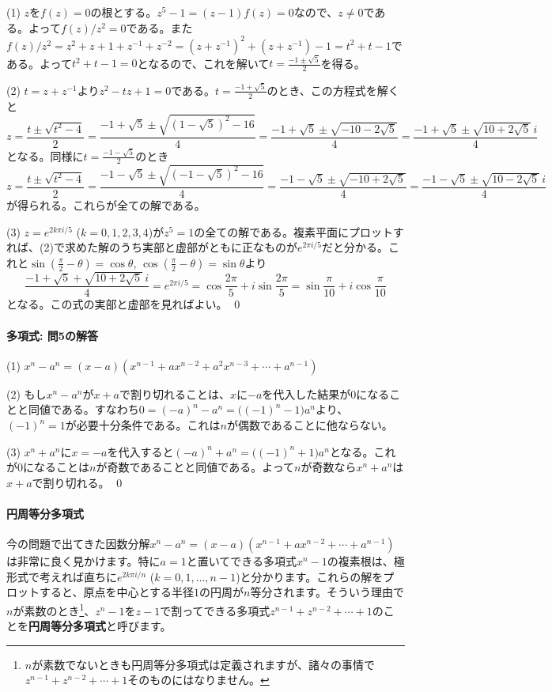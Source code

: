 \noindent (1) $z$を$f(z)=0$の根とする。$z^5-1=(z-1)f(z)=0$なので、$z\neq 0$である。よって$f(z)/z^2=0$である。また$f(z)/z^2=z^2+z+1+z^{-1}+z^{-2} = (z+z^{-1})^2 + (z+z^{-1}) - 1 = t^2+t-1$である。よって$t^2+t-1=0$となるので、これを解いて$t=\frac{-1\pm\sqrt{5}}{2}$を得る。

\noindent (2) $t=z+z^{-1}$より$z^2-tz+1=0$である。$t=\frac{-1+\sqrt{5}}{2}$のとき、この方程式を解くと
\[
z = \frac{t\pm\sqrt{t^2-4}}{2} = \frac{-1+\sqrt{5}\pm\sqrt{(1-\sqrt{5})^2-16}}{4}
= \frac{-1+\sqrt{5}\pm\sqrt{-10-2\sqrt{5}}}{4}
= \frac{-1+\sqrt{5}\pm\sqrt{10+2\sqrt{5}}\,i}{4}
\]
となる。同様に$t=\frac{-1-\sqrt{5}}{2}$のとき
\[
z = \frac{t\pm\sqrt{t^2-4}}{2} = \frac{-1-\sqrt{5}\pm\sqrt{(-1-\sqrt{5})^2-16}}{4}
= \frac{-1-\sqrt{5}\pm\sqrt{-10+2\sqrt{5}}}{4}
= \frac{-1-\sqrt{5}\pm\sqrt{10-2\sqrt{5}}\,i}{4}
\]
が得られる。これらが全ての解である。

\noindent (3) $z = e^{2k\pi i/5}$ ($k=0,1,2,3,4$)が$z^5=1$の全ての解である。複素平面にプロットすれば、(2)で求めた解のうち実部と虚部がともに正なものが$e^{2\pi i/5}$だと分かる。これと$\sin(\frac{\pi}{2}-\theta) = \cos\theta$, $\cos(\frac{\pi}{2}-\theta) = \sin\theta$より
\[
\frac{-1+\sqrt{5}+\sqrt{10+2\sqrt{5}}\,i}{4} = e^{2\pi i/5}
= \cos\frac{2\pi}{5} + i \sin \frac{2\pi}{5} = \sin\frac{\pi}{10} + i \cos \frac{\pi}{10}
\]
となる。この式の実部と虚部を見ればよい。 \qed

\paragraph{多項式: 問5の解答}
\noindent (1) $x^n-a^n = (x-a)(x^{n-1}+ax^{n-2}+a^2x^{n-3}+\cdots+a^{n-1})$

\noindent (2) もし$x^n-a^n$が$x+a$で割り切れることは、$x$に$-a$を代入した結果が$0$になることと同値である。すなわち$0=(-a)^n-a^n=\bigl((-1)^n-1\bigr)a^n$より、$(-1)^n=1$が必要十分条件である。これは$n$が偶数であることに他ならない。

\noindent (3) $x^n+a^n$に$x=-a$を代入すると$(-a)^n+a^n = \bigl((-1)^n+1\bigr)a^n$となる。これが$0$になることは$n$が奇数であることと同値である。よって$n$が奇数なら$x^n+a^n$は$x+a$で割り切れる。 \qed

\paragraph{円周等分多項式} 今の問題で出てきた因数分解$x^n-a^n=(x-a)(x^{n-1}+ax^{n-2}+\cdots+a^{n-1})$は非常に良く見かけます。特に$a=1$と置いてできる多項式$x^n-1$の複素根は、極形式で考えれば直ちに$e^{2k\pi i/n}$ ($k=0,1,\ldots,n-1$)と分かります。これらの解をプロットすると、原点を中心とする半径$1$の円周が$n$等分されます。そういう理由で$n$が素数のとき\footnote{$n$が素数でないときも円周等分多項式は定義されますが、諸々の事情で$z^{n-1}+z^{n-2}+\cdots+1$そのものにはなりません。}、$z^n-1$を$z-1$で割ってできる多項式$z^{n-1}+z^{n-2}+\cdots+1$のことを\textbf{円周等分多項式}と呼びます。

